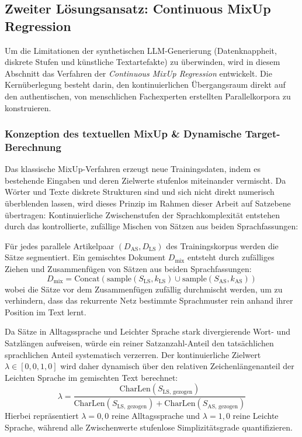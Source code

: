 \subsection{Zweiter Lösungsansatz: Continuous MixUp Regression}
\label{sec:mixup_regression}

Um die Limitationen der synthetischen LLM-Generierung (Datenknappheit, diskrete Stufen und künstliche Textartefakte) zu überwinden, wird in diesem Abschnitt das Verfahren der \textit{Continuous MixUp Regression} entwickelt. Die Kernüberlegung besteht darin, den kontinuierlichen Übergangsraum direkt auf den authentischen, von menschlichen Fachexperten erstellten Parallelkorpora zu konstruieren.

\subsubsection{Konzeption des textuellen MixUp \& Dynamische Target-Berechnung}
\label{sec:mixup_konzeption}

Das klassische MixUp-Verfahren \citep{zhang2018mixup} erzeugt neue Trainingsdaten, indem es bestehende Eingaben und deren Zielwerte stufenlos miteinander vermischt. Da Wörter und Texte diskrete Strukturen sind und sich nicht direkt numerisch überblenden lassen, wird dieses Prinzip im Rahmen dieser Arbeit auf Satzebene übertragen: Kontinuierliche Zwischenstufen der Sprachkomplexität entstehen durch das kontrollierte, zufällige Mischen von Sätzen aus beiden Sprachfassungen:

Für jedes parallele Artikelpaar $(D_{\text{AS}}, D_{\text{LS}})$ des Trainingskorpus werden die Sätze segmentiert. Ein gemischtes Dokument $D_{\text{mix}}$ entsteht durch zufälliges Ziehen und Zusammenfügen von Sätzen aus beiden Sprachfassungen:
\begin{equation}
    D_{\text{mix}} = \text{Concat}\left( \text{sample}(S_{\text{LS}}, k_{\text{LS}}) \cup \text{sample}(S_{\text{AS}}, k_{\text{AS}}) \right)
\end{equation}
wobei die Sätze vor dem Zusammenfügen zufällig durchmischt werden, um zu verhindern, dass das rekurrente Netz bestimmte Sprachmuster rein anhand ihrer Position im Text lernt.

Da Sätze in Alltagssprache und Leichter Sprache stark divergierende Wort- und Satzlängen aufweisen, würde ein reiner Satzanzahl-Anteil den tatsächlichen sprachlichen Anteil systematisch verzerren. Der kontinuierliche Zielwert $\lambda \in [0{,}0, 1{,}0]$ wird daher dynamisch über den relativen Zeichenlängenanteil der Leichten Sprache im gemischten Text berechnet:
\begin{equation}
    \lambda = \frac{\text{CharLen}(S_{\text{LS, gezogen}})}{\text{CharLen}(S_{\text{LS, gezogen}}) + \text{CharLen}(S_{\text{AS, gezogen}})}
\end{equation}
Hierbei repräsentiert $\lambda = 0{,}0$ reine Alltagssprache und $\lambda = 1{,}0$ reine Leichte Sprache, während alle Zwischenwerte stufenlose Simplizitätsgrade quantifizieren.

